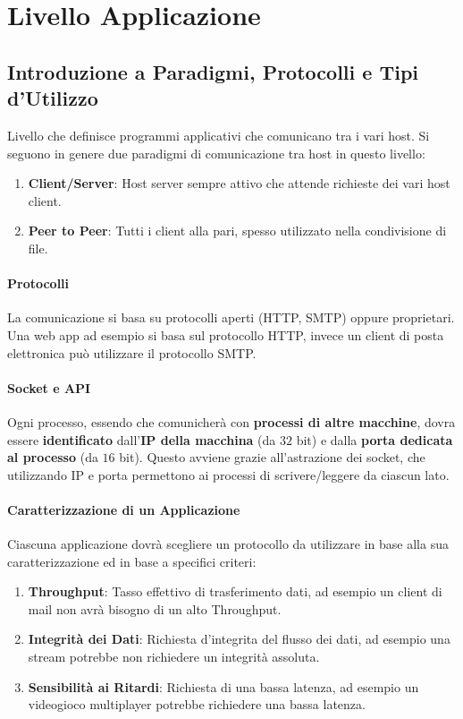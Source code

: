 \documentclass{article}
\begin{document}
\section{Livello Applicazione}

\subsection{Introduzione a Paradigmi, Protocolli e Tipi d'Utilizzo}

Livello che definisce programmi applicativi che comunicano tra i vari host. Si seguono in genere due paradigmi di comunicazione tra host in questo livello:

\begin{enumerate}
    \item \textbf{Client/Server}: Host server sempre attivo che attende richieste dei vari host client.
    \item \textbf{Peer to Peer}: Tutti i client alla pari, spesso utilizzato nella condivisione di file.
\end{enumerate}

\paragraph{Protocolli} La comunicazione si basa su protocolli aperti (HTTP, SMTP) oppure proprietari. Una web app ad esempio si basa sul protocollo HTTP, invece
un client di posta elettronica può utilizzare il protocollo SMTP. 

\paragraph{Socket e API} Ogni processo, essendo che comunicherà con \textbf{processi di altre macchine}, dovra essere \textbf{identificato}
dall'\textbf{IP della macchina} (da $32$ bit) e dalla \textbf{porta dedicata al processo} (da $16$ bit). Questo avviene grazie all'astrazione dei socket, che
utilizzando IP e porta permettono ai processi di scrivere/leggere da ciascun lato.

\paragraph{Caratterizzazione di un Applicazione} Ciascuna applicazione dovrà scegliere un protocollo da utilizzare in base alla sua caratterizzazione ed in base a specifici criteri:

\begin{enumerate}
    \item \textbf{Throughput}: Tasso effettivo di trasferimento dati, ad esempio un client di mail non avrà bisogno di un alto Throughput.
    \item \textbf{Integrità dei Dati}: Richiesta d'integrita del flusso dei dati, ad esempio una stream potrebbe non richiedere un integrità assoluta.
    \item \textbf{Sensibilità ai Ritardi}: Richiesta di una bassa latenza, ad esempio un videogioco multiplayer potrebbe richiedere una bassa latenza.
\end{enumerate}
\end{document}
